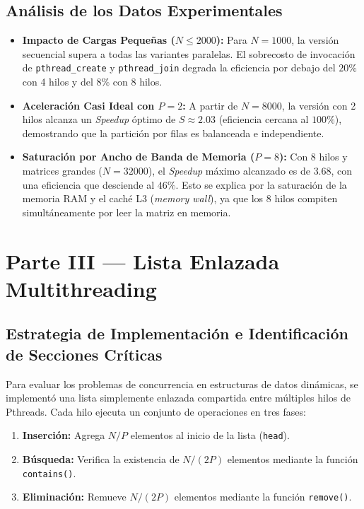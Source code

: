 \documentclass[11pt,a4paper]{article}
\begin{document}
\subsection{Análisis de los Datos Experimentales}
\begin{itemize}
    \item \textbf{Impacto de Cargas Pequeñas ($N \le 2000$):} Para $N = 1000$, la versión secuencial supera a todas las variantes paralelas. El sobrecosto de invocación de \texttt{pthread\_create} y \texttt{pthread\_join} degrada la eficiencia por debajo del $20\%$ con 4 hilos y del $8\%$ con 8 hilos.
    \item \textbf{Aceleración Casi Ideal con $P = 2$:} A partir de $N = 8000$, la versión con 2 hilos alcanza un \textit{Speedup} óptimo de $S \approx 2.03$ (eficiencia cercana al $100\%$), demostrando que la partición por filas es balanceada e independiente.
    \item \textbf{Saturación por Ancho de Banda de Memoria ($P = 8$):} Con 8 hilos y matrices grandes ($N = 32000$), el \textit{Speedup} máximo alcanzado es de $3.68$, con una eficiencia que desciende al $46\%$. Esto se explica por la saturación de la memoria RAM y el caché L3 (\textit{memory wall}), ya que los 8 hilos compiten simultáneamente por leer la matriz en memoria.
\end{itemize}









\section{Parte III — Lista Enlazada Multithreading}

\subsection{Estrategia de Implementación e Identificación de Secciones Críticas}
Para evaluar los problemas de concurrencia en estructuras de datos dinámicas, se implementó una lista simplemente enlazada compartida entre múltiples hilos de Pthreads. Cada hilo ejecuta un conjunto de operaciones en tres fases:
\begin{enumerate}
    \item \textbf{Inserción:} Agrega $N / P$ elementos al inicio de la lista (\texttt{head}).
    \item \textbf{Búsqueda:} Verifica la existencia de $N / (2P)$ elementos mediante la función \texttt{contains()}.
    \item \textbf{Eliminación:} Remueve $N / (2P)$ elementos mediante la función \texttt{remove()}.
\end{enumerate}
\end{document}
